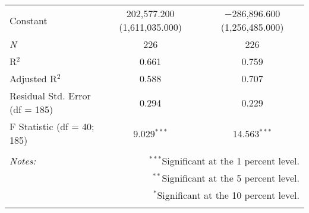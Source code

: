 \documentclass{article}
\begin{document}
\begin{table}[!htbp]
\begin{tabular}{@{\extracolsep{5pt}}lcc}
  Constant & 202,577.200 (1,611,035.000) & $-$286,896.600 (1,256,485.000) \\ 
 \textit{N} & 226 & 226 \\ 
R$^{2}$ & 0.661 & 0.759 \\ 
Adjusted R$^{2}$ & 0.588 & 0.707 \\ 
Residual Std. Error (df = 185) & 0.294 & 0.229 \\ 
F Statistic (df = 40; 185) & 9.029$^{***}$ & 14.563$^{***}$ \\ 
\hline 
\hline \\[-1.8ex] 
\textit{Notes:} & \multicolumn{2}{r}{$^{***}$Significant at the 1 percent level.} \\ 
 & \multicolumn{2}{r}{$^{**}$Significant at the 5 percent level.} \\ 
 & \multicolumn{2}{r}{$^{*}$Significant at the 10 percent level.} \\ 
\normalsize 
\end{tabular} 
\end{table} 
\end{document}
